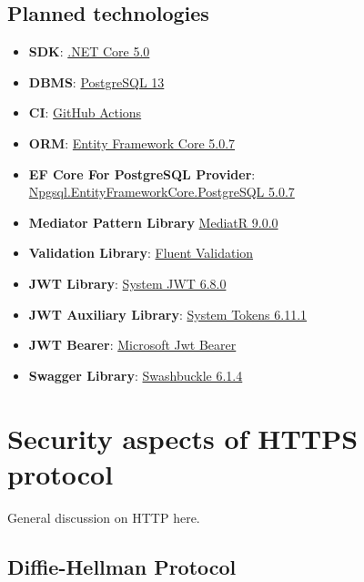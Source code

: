 \subsection{Planned technologies}\label{subsec:planned-technologies}
\begin{itemize}
    \item \textbf{SDK}: \href{https://dotnet.microsoft.com/download/dotnet/5.0}{.NET Core 5.0}
    \item \textbf{DBMS}: \href{https://www.postgresql.org/}{PostgreSQL 13}
    \item \textbf{CI}: \href{https://docs.github.com/en/actions}{GitHub Actions}
    \item \textbf{ORM}: \href{https://www.nuget.org/packages/Microsoft.EntityFrameworkCore/5.0.7?_src=template}{Entity Framework Core 5.0.7}
    \item \textbf{EF Core For PostgreSQL Provider}: \href{https://www.nuget.org/packages/Npgsql.EntityFrameworkCore.PostgreSQL/5.0.7?_src=template}{Npgsql.EntityFrameworkCore.PostgreSQL 5.0.7}
    \item \textbf{Mediator Pattern Library} \href{https://www.nuget.org/packages/MediatR/9.0.0?_src=template}{MediatR 9.0.0}
    \item \textbf{Validation Library}: \href{https://www.nuget.org/packages/FluentValidation/10.2.3?_src=template}{Fluent Validation}
    \item \textbf{JWT Library}: \href{https://www.nuget.org/packages/System.IdentityModel.Tokens.Jwt}{System JWT 6.8.0}
    \item \textbf{JWT Auxiliary Library}: \href{https://www.nuget.org/packages/System.IdentityModel.Tokens}{System Tokens 6.11.1}
    \item \textbf{JWT Bearer}: \href{https://www.nuget.org/packages/Microsoft.AspNetCore.Authentication.JwtBearer/5.0.7?_src=template}{Microsoft Jwt Bearer}
    \item \textbf{Swagger Library}: \href{https://www.nuget.org/packages/Swashbuckle.AspNetCore/5.6.3?_src=template}{Swashbuckle 6.1.4}
\end{itemize}


\section{Security aspects of HTTPS protocol}\label{sec:security-aspects-of-https-protocol}
General discussion on HTTP here.

\subsection{Diffie-Hellman Protocol}\label{subsec:diffie-hellman-protocol}

